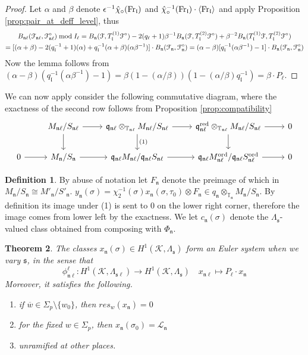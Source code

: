 \documentclass[leqno]{amsart}
\newtheorem{thm}{Theorem}[section]
\theoremstyle{definition}
\newtheorem{defn}[thm]{Definition}
\theoremstyle{remark}
\newcommand{\Fr}{\textnormal{Fr}} %
\newcommand{\fl}{\mathfrak{l}}
\newcommand{\fn}{\mathfrak{n}}
\newcommand{\fq}{\mathfrak{q}}
\newcommand{\fs}{\mathfrak{s}}
\newcommand{\red}{\textnormal{red}}
\newcommand{\K}{{\mathcal{K}}} %
\newcommand{\bw}{\overline{w}}
\newcommand{\TT}{\mathbb{T}} %
\newcommand{\euF}{\EuScript{F}} %
\newcommand{\ord}{\textnormal{ord}} %
\begin{document}
\begin{proof}
Let $\alpha$ and  $\beta$ denote 
$\epsilon^{-1}\hat{\chi}_\circ(\Fr_\fl)$ and 
$\hat{\chi}_\circ^{-1}(\Fr_\fl)\cdot
\langle \Fr_\fl\rangle$
and apply Proposition \ref{prop:pair_at_deff_level}, thus
\begin{multline*}
B_{\fn\ell}(\euF_{\fn\ell}, \euF^{\circ}_{\fn\ell})
\bmod I_\ell=
B_\fn(\euF, T_\fl^{(1)}\euF^\circ)
-2(q_\ell+1)\beta^{-1}B_\fn(\euF, T_\fl^{(2)}\euF^\circ)
+\beta^{-2}B_\fn(T_\fl^{(1)}\euF, T_\fl^{(2)}\euF^\circ)
\\=
[(\alpha+\beta)-2(q_\fl^{-1}+1)(\alpha)
+q_\fl^{-1}(\alpha+\beta)(\alpha\beta^{-1})]\cdot 
B_\fn(\euF_{\fn}, \euF^\circ_\fn)=
(\alpha-\beta)[q_\fl^{-1}(\alpha\beta^{-1})-1]\cdot 
B_\fn(\euF_{\fn}, \euF^\circ_\fn)
\end{multline*}
Now the lemma follows from
$(\alpha-\beta)(q_\fl^{-1}(\alpha\beta^{-1})-1)
=\beta(1-(\alpha/\beta))(1-(\alpha/\beta)q_\fl^{-1})
=\beta\cdot P_\ell$.
\end{proof}

We can now apply consider the following 
commutative diagram,
where the exactness of the second row
follows from
Proposition \ref{prop:compatibility}
\[
\begin{tikzcd}
&M_{\fn\ell}/S_{\fn\ell}\arrow[r]\arrow[d]&
\fq_{\fn\ell}\otimes_{\TT_{\fn\ell}}
	M_{\fn\ell}/S_{\fn\ell}\arrow[r]\arrow[d,"(1)"]&
\fq_{\fn\ell}^{\red}\otimes_{\TT_{\fn\ell}}
	M_{\fn\ell}/S_{\fn\ell}\arrow[r]\arrow[d]&0\\
0\arrow[r]&
M_\fn/S_\fn \arrow[r]&
\fq_{\fn\ell}M_{\fn\ell}/\fq_{\fn\ell}S_{\fn\ell} \arrow[r]&
\fq_{\fn\ell}M^{\ord}_{\fn\ell}/
\fq_{\fn\ell}S^{\ord}_{\fn\ell} \arrow[r] &0
\end{tikzcd}
\]

\begin{defn}
	By abuse of notation
	let $F_\fn$
	denote the preimage of which in
	$M_{\fn}/S_{\fn}\cong M'_\fn/S'_\fn$.
	$y_\fn(\sigma)=\chi_2^{-1}(\sigma)
	x_{\fn}(\sigma,\tau_0)\otimes
	F_{\fn}\in 
	q_{\fn}\otimes_{\TT_{\fn}}M_{\fn}/S_{\fn}$.
	By definition
	its image under (1) is sent to $0$
	on the lower right corner,
	therefore the image
	comes from lower left 
	by the exactness.
	We let  $c_{\fn}(\sigma)$
	denote the $\Lambda_{\fs}$-valued
	class obtained from composing
	with $\Phi_\fn$.
\end{defn}

\begin{thm}
	The classes $x_{\fn}(\sigma)\in 
	H^1(\K, \Lambda_{\fs})$
	form an Euler system when we vary $\fs$,
	in the sense that 
	\[
		\phi_{\fn\ell}^{\ell}\colon
		H^1(\K,\Lambda_{\fs\ell})\to 
		H^1(\K,\Lambda_{\fs})\quad
		x_{\fn\ell}\mapsto
		P_\ell\cdot x_\fn
	\]
	Moreover, it satisfies the following.
	\begin{enumerate}[label=(\alph*)]
		\item if $\bw\in \Sigma_p\setminus\{w_0\}$,
		then  $res_w(x_\fn)=0$
	\item for the fixed  $w\in \Sigma_p$,
		then  $x_\fn(\sigma_0)=\mathcal{L}_\fn$
	\item unramified at other places.
	\end{enumerate}
\end{thm}
\end{document}
